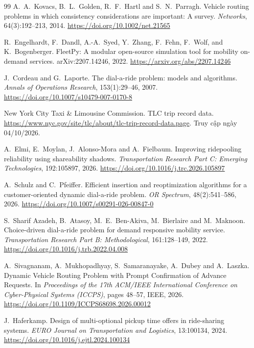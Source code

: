 \begin{thebibliography}{99}
A.~A.~Kovacs, B.~L.~Golden, R.~F.~Hartl and S.~N.~Parragh.
\newblock Vehicle routing problems in which consistency considerations are important: A survey.
\newblock \emph{Networks}, 64(3):192--213, 2014.
\newblock \url{https://doi.org/10.1002/net.21565}

R.~Engelhardt, F.~Dandl, A.-A.~Syed, Y.~Zhang, F.~Fehn, F.~Wolf, and K.~Bogenberger.
\newblock FleetPy: A modular open-source simulation tool for mobility on-demand services.
\newblock arXiv:2207.14246, 2022.
\newblock \url{https://arxiv.org/abs/2207.14246}

J.~Cordeau and G.~Laporte.
\newblock The dial-a-ride problem: models and algorithms.
\newblock \emph{Annals of Operations Research}, 153(1):29--46, 2007.
\newblock \url{https://doi.org/10.1007/s10479-007-0170-8}

New York City Taxi \& Limousine Commission.
\newblock TLC trip record data.
\newblock \url{https://www.nyc.gov/site/tlc/about/tlc-trip-record-data.page}. Truy cập ngày 04/10/2026.

A.~Elmi, E.~Moylan, J.~Alonso-Mora and A.~Fielbaum.
\newblock Improving ridepooling reliability using shareability shadows.
\newblock \emph{Transportation Research Part C: Emerging Technologies}, 192:105897, 2026.
\newblock \url{https://doi.org/10.1016/j.trc.2026.105897}

A.~Schulz and C.~Pfeiffer.
\newblock Efficient insertion and reoptimization algorithms for a customer-oriented dynamic dial-a-ride problem.
\newblock \emph{OR Spectrum}, 48(2):541--586, 2026.
\newblock \url{https://doi.org/10.1007/s00291-026-00847-0}

S.~Sharif Azadeh, B.~Atasoy, M.~E.~Ben-Akiva, M.~Bierlaire and M.~Maknoon.
\newblock Choice-driven dial-a-ride problem for demand responsive mobility service.
\newblock \emph{Transportation Research Part B: Methodological}, 161:128--149, 2022.
\newblock \url{https://doi.org/10.1016/j.trb.2022.04.008}

A.~Sivagnanam, A.~Mukhopadhyay, S.~Samaranayake, A.~Dubey and A.~Laszka.
\newblock Dynamic Vehicle Routing Problem with Prompt Confirmation of Advance Requests.
\newblock In \emph{Proceedings of the 17th ACM/IEEE International Conference on Cyber-Physical Systems (ICCPS)}, pages 48--57, IEEE, 2026.
\newblock \url{https://doi.org/10.1109/ICCPS68698.2026.00012}

J.~Haferkamp.
\newblock Design of multi-optional pickup time offers in ride-sharing systems.
\newblock \emph{EURO Journal on Transportation and Logistics}, 13:100134, 2024.
\newblock \url{https://doi.org/10.1016/j.ejtl.2024.100134}


\end{thebibliography}
